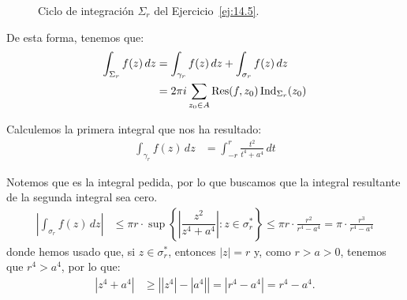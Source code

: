 \begin{ejercicio}
\begin{figure}
        \caption{Ciclo de integración $\Sigma_r$ del Ejercicio~\ref{ej:14.5}.}
        \label{fig:ej:14.5}
    \end{figure}

    De esta forma, tenemos que:
    \begin{align*}
        \int_{\Sigma_r} f(z) \, dz &= \int_{\gamma_r} f(z) \, dz + \int_{\sigma_r} f(z) \, dz \\
        &= 2\pi i\sum_{z_0\in A}\operatorname{Res}(f,z_0)\operatorname{Ind}_{\Sigma_r}(z_0)
    \end{align*}

    Calculemos la primera integral que nos ha resultado:
    \begin{align*}
        \int_{\gamma_r} f(z) \, dz &= \int_{-r}^{r} \frac{t^2}{t^4 + a^4} \, dt
    \end{align*}

    Notemos que es la integral pedida, por lo que buscamos que la integral resultante de la segunda integral sea cero.
    \begin{align*}
        \left| \int_{\sigma_r} f(z) \, dz \right|
        &\leq \pi r\cdot \sup\left\{\left|\dfrac{z^2}{z^4 + a^4}\right| : z\in \sigma_r^*\right\}
        \leq \pi r\cdot \frac{r^2}{r^4 - a^4}
        = \pi \cdot \frac{r^3}{r^4 - a^4}
    \end{align*}
    donde hemos usado que, si $z\in \sigma_r^*$, entonces $|z|=r$ y, como $r>a>0$, tenemos que $r^4>a^4$, por lo que:
    \begin{align*}
        |z^4 + a^4| &\geq \left||z^4| - |a^4|\right| = \left|r^4 - a^4\right| = r^4 - a^4.
    \end{align*}


\end{ejercicio}
